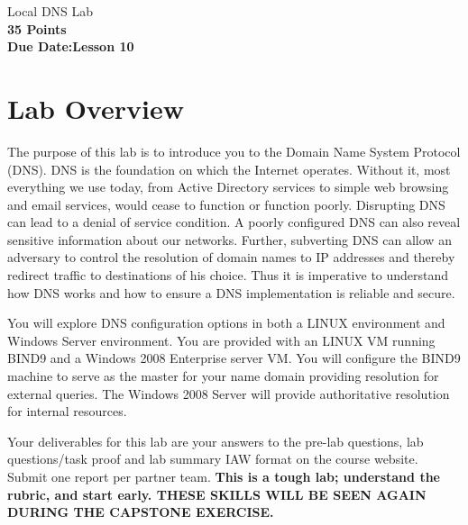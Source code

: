 \documentclass{article}
\begin{document}
\begin{center}
{\LARGE Local DNS 
Lab\\}
\textbf{35 Points }\\
\textbf{Due Date:Lesson 10}
\end{center}


\copyrightnoticeA

\setcounter{task}{1}
\newcommand{\tasks} {\bf {\noindent (\arabic{task})} \addtocounter{task}{1}\,}

\setcounter{Question}{1}
\newcommand{\question} {\noindent \textbf{ Q\arabic{Question}.} \addtocounter{Question}{1}\,}

\section{Lab Overview}



The purpose of this lab is to introduce you to the Domain Name System Protocol (DNS). DNS is the foundation on which the Internet operates. Without it, most everything we use today, from Active Directory services to simple web browsing and email services, would cease to function or function poorly. Disrupting DNS can lead to a denial of service condition. A poorly configured DNS can also reveal sensitive information about our networks. 
Further, subverting DNS can allow an adversary to control the resolution of domain names to IP addresses and thereby redirect traffic to destinations of his choice. Thus it is imperative to understand how DNS works and how to ensure a DNS implementation is reliable and secure.

You will explore DNS configuration options in both a LINUX environment and Windows Server environment. You are provided with an \ubuntu LINUX VM running BIND9 and a Windows 2008 Enterprise server VM. You will configure the BIND9 machine to serve as the master for your name domain providing resolution for external queries. The Windows 2008 Server will provide authoritative resolution for internal resources.


Your deliverables for this lab are your answers to the pre-lab questions, lab questions/task proof and lab summary IAW format on the course website. Submit one report per partner team.  \textbf{This is a tough lab; understand the rubric, and start early. THESE SKILLS WILL BE SEEN AGAIN DURING THE CAPSTONE EXERCISE.}
\end{document}
